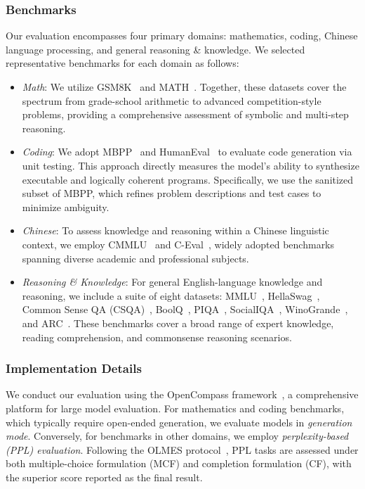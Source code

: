 \subsubsection{Benchmarks}
Our evaluation encompasses four primary domains: mathematics, coding, Chinese language processing, and general reasoning \& knowledge. We selected representative benchmarks for each domain as follows:
\begin{itemize}
    \item \textit{Math}: We utilize GSM8K~\cite{gsm8k} and MATH~\cite{MATH}. Together, these datasets cover the spectrum from grade-school arithmetic to advanced competition-style problems, providing a comprehensive assessment of symbolic and multi-step reasoning.
    \item \textit{Coding}: We adopt MBPP~\cite{mbpp} and HumanEval~\cite{humaneval} to evaluate code generation via unit testing. This approach directly measures the model's ability to synthesize executable and logically coherent programs. Specifically, we use the sanitized subset of MBPP, which refines problem descriptions and test cases to minimize ambiguity.
    \item \textit{Chinese}: To assess knowledge and reasoning within a Chinese linguistic context, we employ CMMLU~\cite{cmmlu} and C-Eval~\cite{ceval}, widely adopted benchmarks spanning diverse academic and professional subjects.
    \item \textit{Reasoning \& Knowledge}: For general English-language knowledge and reasoning, we include a suite of eight datasets: MMLU~\cite{mmlu}, HellaSwag~\cite{hellaswag}, Common Sense QA (CSQA)~\cite{commonsenseqa}, BoolQ~\cite{clark-etal-2019-boolq}, PIQA~\cite{piqa}, SocialIQA~\cite{socialiqa}, WinoGrande~\cite{winogrande}, and ARC~\cite{arc}. These benchmarks cover a broad range of expert knowledge, reading comprehension, and commonsense reasoning scenarios.
\end{itemize}

\subsubsection{Implementation Details}
We conduct our evaluation using the OpenCompass framework~\cite{2023opencompass}, a comprehensive platform for large model evaluation. For mathematics and coding benchmarks, which typically require open-ended generation, we evaluate models in \textit{generation mode}. Conversely, for benchmarks in other domains, we employ \textit{perplexity-based (PPL) evaluation}. Following the OLMES protocol~\cite{gu2025olmes}, PPL tasks are assessed under both multiple-choice formulation (MCF) and completion formulation (CF), with the superior score reported as the final result.

